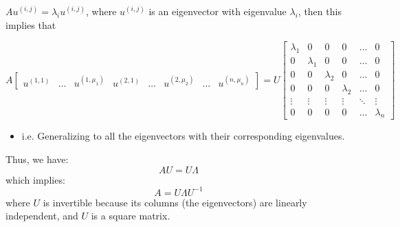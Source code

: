 \begin{derivation}
    $A u^{(i,j)} = \lambda_i u^{(i,j)}$, where $u^{(i,j)}$ is an eigenvector with eigenvalue $\lambda_i$, then this implies that

    \[
    A \begin{bmatrix}
    u^{(1,1)} & \dots & u^{(1,\mu_1)} & u^{(2,1)} & \dots & u^{(2,\mu_2)} & \dots & u^{(n,\mu_n)}
    \end{bmatrix}
    = U
    \begin{bmatrix}
        \lambda_1 & 0 & 0 & 0 & \dots & 0 \\
        0 & \lambda_1 & 0 & 0 & \dots & 0 \\
        0 & 0 & \lambda_2 & 0 & \dots & 0 \\
        0 & 0 & 0 & \lambda_2 & \dots & 0 \\
        \vdots & \vdots & \vdots & \vdots & \ddots & \vdots \\
        0 & 0 & 0 & 0 & \dots & \lambda_n
        \end{bmatrix}
    \]
    \begin{itemize}
        \item i.e. Generalizing to all the eigenvectors with their corresponding eigenvalues. 
    \end{itemize}
    \vspace{1em}

    Thus, we have:
    \[
    A U = U \Lambda
    \]
    which implies:
    \[
    A = U \Lambda U^{-1}
    \]
    where \( U \) is invertible because its columns (the eigenvectors) are linearly independent, and \( U \) is a square matrix.
\end{derivation}

